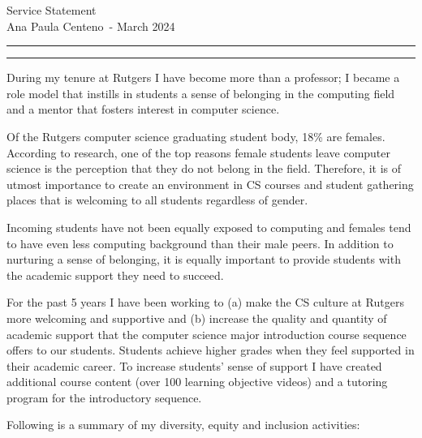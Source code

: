 \documentclass[11pt]{article}
\newcommand{\soptitle}{Service Statement}
\newcommand{\yourname}{Ana Paula Centeno}
\begin{document}
\begin{center}\LARGE\soptitle\\
\large \yourname\ - March 2024
\end{center}

\hrule
\vspace{1pt}
\hrule height 1pt

\bigskip
\bigskip

During my tenure at Rutgers I have become more than a professor; I
became a role model that instills in students a sense of belonging in
the computing field and a mentor that fosters interest in computer
science.

Of the Rutgers computer science graduating student body, 18\% are
females. According to research, one of the top reasons female students
leave computer science is the perception that they do not belong in
the field. Therefore, it is of utmost importance to create an
environment in CS courses and student gathering places that is
welcoming to all students regardless of gender.

Incoming students have not been equally exposed to computing and
females tend to have even less computing background than their male
peers. In addition to nurturing a sense of belonging, it is equally
important to provide students with the academic support they need to
succeed.

For the past 5 years I have been working to (a) make the CS culture at
Rutgers more welcoming and supportive and (b) increase the quality and
quantity of academic support that the computer science major
introduction course sequence offers to our students. Students achieve
higher grades when they feel supported in their academic career. To
increase students' sense of support I have created additional course
content (over 100 learning objective videos) and a tutoring program
for the introductory sequence.

Following is a summary of my diversity, equity and inclusion
activities:


\bigskip
\end{document}
